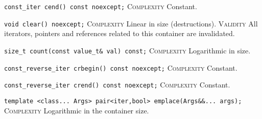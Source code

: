 \noindent{}\hspace*{0.25em}\lstinline[basicstyle=\ttfamily\color{cgreen}]{const_iter cend() const noexcept;} \textsc{Complexity} Constant.\\\vspace{-0.6em}

\noindent{}\hspace*{0.25em}\lstinline[basicstyle=\ttfamily\color{corange}]{void clear() noexcept;} \textsc{Complexity} Linear in size (destructions). \textsc{Validity} All iterators, pointers and references related to this container are invalidated.\\\vspace{-0.6em}

\noindent{}\hspace*{0.25em}\lstinline[basicstyle=\ttfamily\color{clime}]{size_t count(const value_t& val) const;} \textsc{Complexity} Logarithmic in size.\\\vspace{-0.6em}

\noindent{}\hspace*{0.25em}\lstinline[basicstyle=\ttfamily\color{cgreen}]{const_reverse_iter crbegin() const noexcept;} \textsc{Complexity} Constant.\\\vspace{-0.6em}

\noindent{}\hspace*{0.25em}\lstinline[basicstyle=\ttfamily\color{cgreen}]{const_reverse_iter crend() const noexcept;} \textsc{Complexity} Constant.\\\vspace{-0.6em}

\noindent{}\hspace*{0.25em}\lstinline[basicstyle=\ttfamily\color{clime}]{template <class... Args> pair<iter,bool> emplace(Args&&... args);} \textsc{Complexity} Logarithmic in the container size.\\\vspace{-0.6em}

